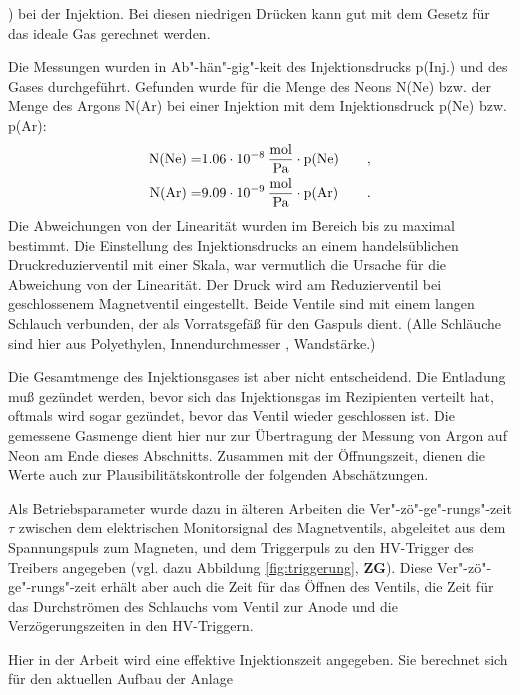 ) bei der Injektion. Bei diesen niedrigen Drücken kann
gut mit dem Gesetz für das ideale Gas gerechnet werden.
\par
Die Messungen wurden in Ab"-hän"-gig"-keit des Injektionsdrucks
p(Inj.) und des Gases durchgeführt. Gefunden wurde für die Menge
des Neons N(Ne) bzw. der Menge des Argons N(Ar) bei einer
Injektion mit dem Injektionsdruck p(Ne) bzw. p(Ar):
\begin{eqnarray*}
  \rm{N(Ne)} =
  & 1.06 \cdot 10^{-8} \,\rm \frac{mol}{Pa} \cdot \rm{p(Ne)}
  &\quad ,
  \\
  \rm{N(Ar)} =
  & 9.09 \cdot 10^{-9} \,\rm \frac{mol}{Pa} \cdot \rm{p(Ar)}
  &\quad .
\end{eqnarray*}
Die Abweichungen von der Linearität wurden im Bereich
 bis  zu maximal 
bestimmt. Die Einstellung des Injektionsdrucks an einem handelsüblichen
Druckreduzierventil mit einer  Skala, war vermutlich die
Ursache für die Abweichung von der Linearität. Der Druck wird am
Reduzierventil bei geschlossenem Magnetventil eingestellt. Beide
Ventile sind mit einem  langen Schlauch verbunden, der als
Vorratsgefäß für den Gaspuls dient. (Alle Schläuche sind hier aus
Polyethylen, Innendurchmesser ,  Wandstärke.)
\par
Die Gesamtmenge des Injektionsgases ist aber nicht entscheidend. Die
Entladung muß gezündet werden, bevor sich das Injektionsgas im
Rezipienten verteilt hat, oftmals wird sogar gezündet, bevor das Ventil
wieder geschlossen ist. Die gemessene Gasmenge dient hier nur zur
Übertragung der Messung von Argon auf Neon am Ende dieses Abschnitts.
Zusammen mit der Öffnungszeit, dienen die Werte auch zur
Plausibilitätskontrolle der folgenden Abschätzungen.
\par
Als Betriebsparameter wurde dazu in älteren Arbeiten
\cite{maelzig:phd,lucas:diplom,roewe:phd} die
Ver"-zö"-ge"-rungs"-zeit $\tau$ zwischen dem elektrischen
Monitorsignal des Magnetventils, abgeleitet aus dem Spannungspuls
zum Magneten, und dem Triggerpuls zu den HV-Trigger des Treibers
angegeben (vgl. dazu Abbildung \vref{fig:triggerung}, {\bf ZG}).
Diese Ver"-zö"-ge"-rungs"-zeit erhält aber auch die Zeit für das
Öffnen des Ventils, die Zeit für das Durchströmen des Schlauchs
vom Ventil zur Anode und die Verzögerungszeiten in den
HV-Triggern.
\par
Hier in der Arbeit wird eine effektive Injektionszeit \teff
angegeben. Sie berechnet sich für den aktuellen Aufbau der Anlage

